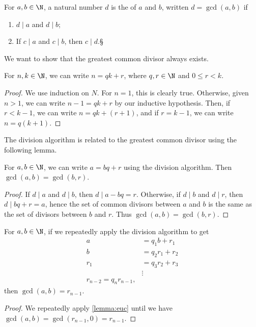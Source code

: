 \begin{definition}
	For $a, b \in \N$, a natural number $d$ is the  of $a$ and $b$, written $d = \gcd(a, b)$ if
	\begin{enumerate}[label=(\roman*)]
		\item $d \mid a$ and $d \mid b$;
		\item If $c \mid a$ and $c \mid b$, then $c \mid d$.§
	\end{enumerate}
\end{definition}

We want to show that the greatest common divisor always exists.

\begin{proposition}
	For $n, k \in \N$, we can write $n = qk + r$, where $q, r \in \N$ and $0 \leq r < k$.
\end{proposition}
\begin{proof}
	We use induction on $N$. For $n = 1$, this is clearly true. Otherwise, given $n > 1$, we can write $n - 1 = qk + r$ by our inductive hypothesis. Then, if $r < k - 1$, we can write $n = qk + (r + 1)$, and if $r = k - 1$, we can write $n = q(k + 1)$.
\end{proof}

The division algorithm is related to the greatest common divisor using the following lemma.

\begin{lemma}[Euclid]\label{lemma:euc}
	For $a, b \in \N$, we can write $a = bq + r$ using the division algorithm. Then $\gcd(a, b) = \gcd(b, r)$.
\end{lemma}
\begin{proof}
	If $d \mid a$ and $d \mid b$, then $d \mid a - bq = r$.
	Otherwise, if $d \mid b$ and $d \mid r$, then $d \mid bq + r = a$, hence the set of common divisors between $a$ and $b$ is the same as the set of divisors between $b$ and $r$. Thus $\gcd(a, b) = \gcd(b, r)$.
\end{proof}

\begin{theorem}
	For $a, b \in \N$, if we repeatedly apply the division algorithm to get
	\begin{align*}
		a &= q_1 b + r_1 \\
		b &= q_2 r_1 + r_2 \\
		r_1 &= q_3 r_2 + r_3 \\
		&\vdots \\
		r_{n - 2} = q_n r_{n - 1},
	\end{align*}
	then $\gcd(a, b) = r_{n - 1}$.
\end{theorem}
\begin{proof}
	We repeatedly apply \autoref{lemma:euc} until we have $\gcd(a, b) = \gcd(r_{n - 1}, 0) = r_{n - 1}$.
\end{proof}

